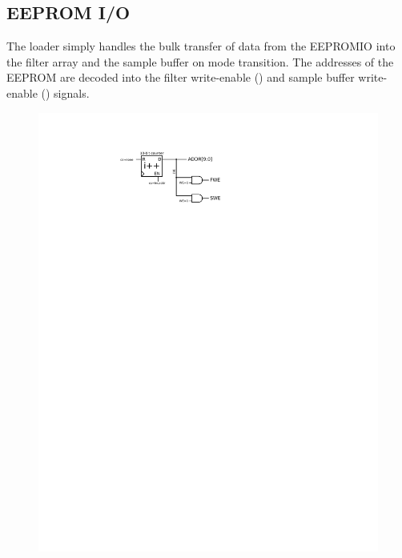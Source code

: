 \subsection{EEPROM I/O}
The loader simply handles the bulk transfer of data from the EEPROMIO
into the filter array and the sample buffer on mode transition. The
addresses of the EEPROM are decoded into the filter write-enable
() and sample buffer write-enable () signals.


\begin{figure}[h!]
\includegraphics[scale=0.7]{loader.svg}
\end{figure}

